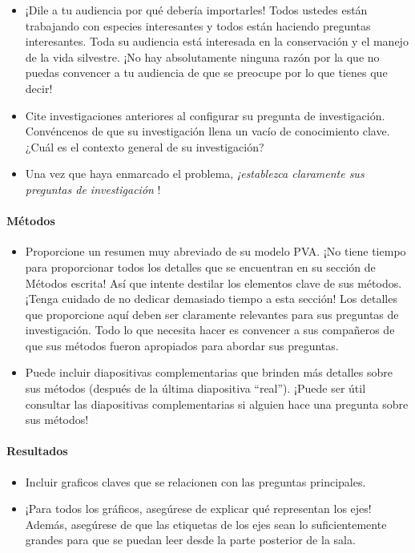 \documentclass[
]{article}
\begin{document}
\begin{itemize}
\item
  ¡Dile a tu audiencia por qué debería importarles! Todos ustedes están
  trabajando con especies interesantes y todos están haciendo preguntas
  interesantes. Toda su audiencia está interesada en la conservación y
  el manejo de la vida silvestre. ¡No hay absolutamente ninguna razón
  por la que no puedas convencer a tu audiencia de que se preocupe por
  lo que tienes que decir!
\item
  Cite investigaciones anteriores al configurar su pregunta de
  investigación. Convéncenos de que su investigación llena un vacío de
  conocimiento clave. ¿Cuál es el contexto general de su investigación?
\item
  Una vez que haya enmarcado el problema, \emph{¡establezca claramente
  sus preguntas de investigación }!
\end{itemize}

\hypertarget{muxe9todos-1}{%
\paragraph{Métodos}\label{muxe9todos-1}}

\begin{itemize}
\item
  Proporcione un resumen muy abreviado de su modelo PVA. ¡No tiene
  tiempo para proporcionar todos los detalles que se encuentran en su
  sección de Métodos escrita! Así que intente destilar los elementos
  clave de sus métodos. ¡Tenga cuidado de no dedicar demasiado tiempo a
  esta sección! Los detalles que proporcione aquí deben ser claramente
  relevantes para sus preguntas de investigación. Todo lo que necesita
  hacer es convencer a sus compañeros de que sus métodos fueron
  apropiados para abordar sus preguntas.
\item
  Puede incluir diapositivas complementarias que brinden más detalles
  sobre sus métodos (después de la última diapositiva ``real''). ¡Puede
  ser útil consultar las diapositivas complementarias si alguien hace
  una pregunta sobre sus métodos!
\end{itemize}

\hypertarget{resultados-1}{%
\paragraph{Resultados}\label{resultados-1}}

\begin{itemize}
\item
  Incluir graficos claves que se relacionen con las preguntas
  principales.
\item
  ¡Para todos los gráficos, asegúrese de explicar qué representan los
  ejes! Además, asegúrese de que las etiquetas de los ejes sean lo
  suficientemente grandes para que se puedan leer desde la parte
  posterior de la sala.
\end{itemize}
\end{document}
